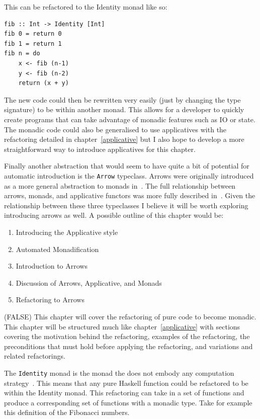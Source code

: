 This can be refactored to the Identity monad like so:\pagebreak

\begin{lstlisting}[frame=tblr]
fib :: Int -> Identity [Int]
fib 0 = return 0
fib 1 = return 1
fib n = do
	x <- fib (n-1)
	y <- fib (n-2)
	return (x + y)
\end{lstlisting}

The new code could then be rewritten very easily (just by changing the type signature) to be within another monad. This allows for a developer to quickly create programs that can take advantage of monadic features such as IO or state. The monadic code could also be generalised to use applicatives with the refactoring detailed in chapter~\ref{applicative} but I also hope to develop a more straightforward way to introduce applicatives for this chapter.

Finally another abstraction that would seem to have quite a bit of potential for automatic introduction is the \texttt{Arrow} typeclass. Arrows were originally introduced as a more general abstraction to monads in~\citep{genMonadsArrows}. The full relationship between arrows, monads, and applicative functors was more fully described in~\citep{arrowsAndIdioms}. Given the relationship between these three typeclasses I believe it will be worth exploring introducing arrows as well. A possible outline of this chapter would be:

\begin{enumerate}
\item Introducing the Applicative style
\item Automated Monadification
\item Introduction to Arrows
\item Discussion of Arrows, Applicative, and Monads
\item Refactoring to Arrows
\end{enumerate} 

\if(FALSE)
This chapter will cover the refactoring of pure code to become monadic. This chapter will be structured much like chapter~\ref{applicative} with sections covering the motivation behind the refactoring, examples of the refactoring, the preconditions that must hold before applying the refactoring, and variations and related refactorings. 

The \texttt{Identity} monad is the monad the does not embody any computation strategy~\citep{identityMonad}. This means that any pure Haskell function could be refactored to be within the Identity monad. This refactoring can take in a set of functions and produce a corresponding set of functions with a monadic type. Take for example this definition of the Fibonacci numbers.


